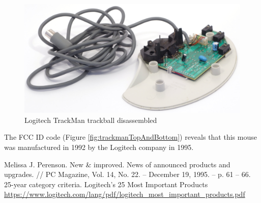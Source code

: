 \documentclass[11pt, a4paper]{article}
\begin{document}
\begin{figure}[h]
    \centering
    \includegraphics[scale=0.6]{1995_logitech_trackman/inside_30.jpg}
    \caption{Logitech TrackMan trackball disassembled}
    \label{fig:trackmanInside}
\end{figure}

 The FCC ID code (Figure \ref{fig:trackmanTopAndBottom}) reveals that this mouse was manufactured in 1992 by the Logitech company in 1995.


\begin{thebibliography}{9}
 Melissa J. Perenson. New \& improved. News of announced products and upgrades. // PC Magazine, Vol. 14, No. 22. -- December 19, 1995. -- p. 61 -- 66.
 25-year category criteria. Logitech’s 25 Most Important Products \url{https://www.logitech.com/lang/pdf/logitech_most_important_products.pdf}
\end{thebibliography}
\end{document}
